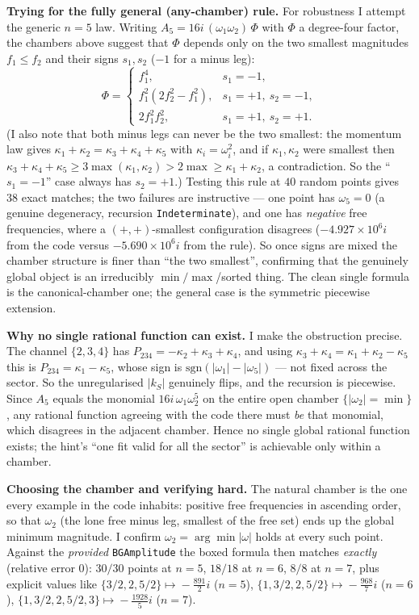 \documentclass[11pt]{article}
\begin{document}
\medskip
\noindent\textbf{Trying for the fully general (any-chamber) rule.}
For robustness I attempt the generic $n=5$ law. Writing $A_5=16i\,(\omega_1\omega_2)\,\Phi$
with $\Phi$ a degree-four factor, the chambers above suggest that $\Phi$ depends only on the
two smallest magnitudes $f_1\le f_2$ and their signs $s_1,s_2$ ($-1$ for a minus leg):
\[
\Phi=\begin{cases}
f_1^4,& s_1=-1,\\
f_1^2(2f_2^2-f_1^2),& s_1=+1,\ s_2=-1,\\
2f_1^2f_2^2,& s_1=+1,\ s_2=+1.
\end{cases}
\]
(I also note that both minus legs can never be the two smallest: the momentum law gives
$\kappa_1+\kappa_2=\kappa_3+\kappa_4+\kappa_5$ with $\kappa_i=\omega_i^2$, and if
$\kappa_1,\kappa_2$ were smallest then $\kappa_3+\kappa_4+\kappa_5\ge3\max(\kappa_1,\kappa_2)
>2\max\ge\kappa_1+\kappa_2$, a contradiction. So the ``$s_1=-1$'' case always has $s_2=+1$.)
Testing this rule at $40$ random points gives $38$ exact matches; the two failures are
instructive --- one point has $\omega_5=0$ (a genuine degeneracy, recursion
\texttt{Indeterminate}), and one has \emph{negative} free frequencies, where a
$(+,+)$-smallest configuration disagrees ($-4.927\times10^6 i$ from the code versus
$-5.690\times10^6 i$ from the rule). So once signs are mixed the chamber structure is finer
than ``the two smallest'', confirming that the genuinely global object is an irreducibly
$\min/\max$/sorted thing. The clean single formula is the canonical-chamber one; the general
case is the symmetric piecewise extension.

\medskip
\noindent\textbf{Why no single rational function can exist.}
I make the obstruction precise. The channel $\{2,3,4\}$ has
$P_{234}=-\kappa_2+\kappa_3+\kappa_4$, and using $\kappa_3+\kappa_4=\kappa_1+\kappa_2-\kappa_5$
this is $P_{234}=\kappa_1-\kappa_5$, whose sign is $\mathrm{sgn}(|\omega_1|-|\omega_5|)$ ---
not fixed across the sector. So the unregularised $|k_S|$ genuinely flips, and the recursion
is piecewise. Since $A_5$ equals the monomial $16i\,\omega_1\omega_2^5$ on the entire open
chamber $\{|\omega_2|=\min\}$, any rational function agreeing with the code there must
\emph{be} that monomial, which disagrees in the adjacent chamber. Hence no single global
rational function exists; the hint's ``one fit valid for all the sector'' is achievable only
within a chamber.

\medskip
\noindent\textbf{Choosing the chamber and verifying hard.}
The natural chamber is the one every example in the code inhabits: positive free frequencies
in ascending order, so that $\omega_2$ (the lone free minus leg, smallest of the free set)
ends up the global minimum magnitude. I confirm $\omega_2=\arg\min|\omega|$ holds at every
such point. Against the \emph{provided} \texttt{BGAmplitude} the boxed formula then matches
\emph{exactly} (relative error $0$): $30/30$ points at $n=5$, $18/18$ at $n=6$, $8/8$ at
$n=7$, plus explicit values like $\{3/2,2,5/2\}\!\mapsto\!-\tfrac{891}{2}i$ ($n=5$),
$\{1,3/2,2,5/2\}\!\mapsto\!-\tfrac{968}{7}i$ ($n=6$),
$\{1,3/2,2,5/2,3\}\!\mapsto\!-\tfrac{1928}{5}i$ ($n=7$).
\end{document}
